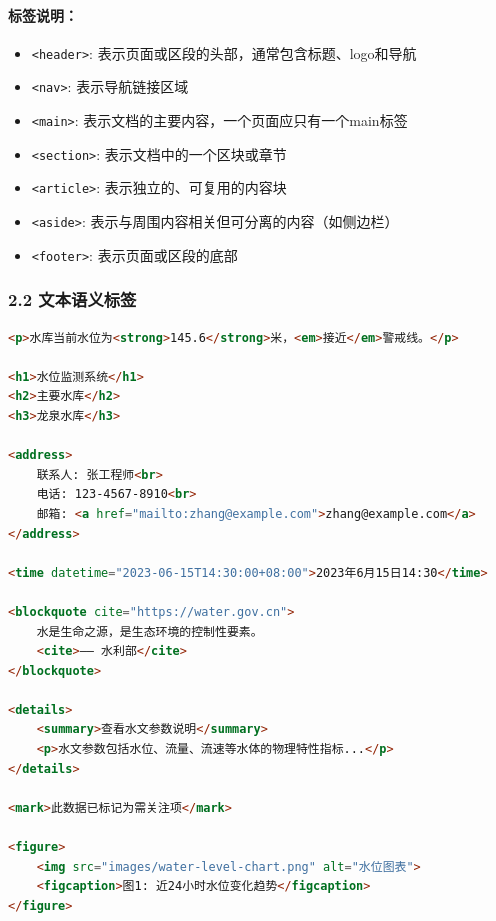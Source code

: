 \paragraph{标签说明：}\label{ux6807ux7b7eux8bf4ux660e}

\begin{itemize}
\tightlist
\item
  \passthrough{\lstinline!<header>!}:
  表示页面或区段的头部，通常包含标题、logo和导航
\item
  \passthrough{\lstinline!<nav>!}: 表示导航链接区域
\item
  \passthrough{\lstinline!<main>!}:
  表示文档的主要内容，一个页面应只有一个main标签
\item
  \passthrough{\lstinline!<section>!}: 表示文档中的一个区块或章节
\item
  \passthrough{\lstinline!<article>!}: 表示独立的、可复用的内容块
\item
  \passthrough{\lstinline!<aside>!}:
  表示与周围内容相关但可分离的内容（如侧边栏）
\item
  \passthrough{\lstinline!<footer>!}: 表示页面或区段的底部
\end{itemize}

\subsubsection{2.2
文本语义标签}\label{ux6587ux672cux8bedux4e49ux6807ux7b7e}

\begin{lstlisting}[language=HTML]
<p>水库当前水位为<strong>145.6</strong>米，<em>接近</em>警戒线。</p>

<h1>水位监测系统</h1>
<h2>主要水库</h2>
<h3>龙泉水库</h3>

<address>
    联系人: 张工程师<br>
    电话: 123-4567-8910<br>
    邮箱: <a href="mailto:zhang@example.com">zhang@example.com</a>
</address>

<time datetime="2023-06-15T14:30:00+08:00">2023年6月15日14:30</time>

<blockquote cite="https://water.gov.cn">
    水是生命之源，是生态环境的控制性要素。
    <cite>—— 水利部</cite>
</blockquote>

<details>
    <summary>查看水文参数说明</summary>
    <p>水文参数包括水位、流量、流速等水体的物理特性指标...</p>
</details>

<mark>此数据已标记为需关注项</mark>

<figure>
    <img src="images/water-level-chart.png" alt="水位图表">
    <figcaption>图1: 近24小时水位变化趋势</figcaption>
</figure>
\end{lstlisting}

